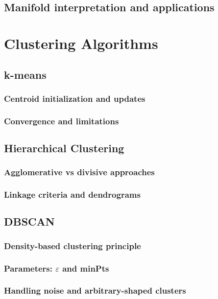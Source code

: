 \subsection{Manifold interpretation and applications}

\section{Clustering Algorithms}
\subsection{k-means}
\subsubsection{Centroid initialization and updates}
\subsubsection{Convergence and limitations}
\subsection{Hierarchical Clustering}
\subsubsection{Agglomerative vs divisive approaches}
\subsubsection{Linkage criteria and dendrograms}
\subsection{DBSCAN}
\subsubsection{Density-based clustering principle}
\subsubsection{Parameters: $\varepsilon$ and minPts}
\subsubsection{Handling noise and arbitrary-shaped clusters}